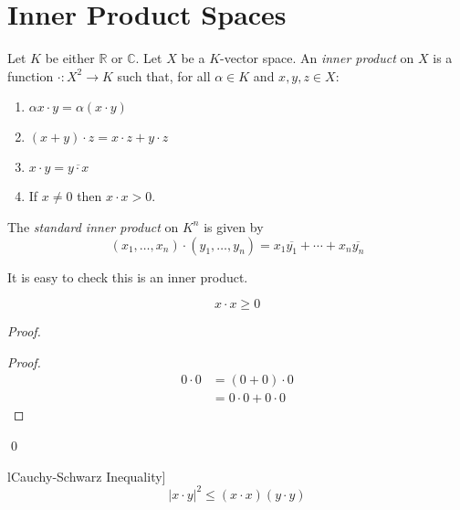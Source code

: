 \chapter{Inner Product Spaces}

\begin{df}
  Let $K$ be either $\mathbb{R}$ or $\mathbb{C}$. Let $X$ be a $K$-vector space. An \emph{inner product} on $X$ is a function $\cdot : X^2 \rightarrow K$ such that, for all $\alpha \in K$ and $x, y, z \in X$:
  \begin{enumerate}
    \item
    $\alpha x \cdot y = \alpha (x \cdot y)$
    \item
    $(x + y) \cdot z = x \cdot z + y \cdot z$
    \item
    $x \cdot y = \overline{y \cdot x}$
    \item
    If $x \neq 0$ then $x \cdot x > 0$.
  \end{enumerate}
\end{df}

\begin{ex}
  The \emph{standard inner product} on $K^n$ is given by
  \[ (x_1, \ldots, x_n) \cdot (y_1, \ldots, y_n) = x_1 \overline{y_1} + \cdots + x_n \overline{y_n} \]

  It is easy to check this is an inner product.
\end{ex}

\begin{prop}
  \label{prop:inner_product:positive_definite}
  \[ x \cdot x \geq 0 \]
\end{prop}

\begin{proof}
  \pf
  \begin{proof}
    \pf
    \begin{align*}
      0 \cdot 0 & = (0 + 0) \cdot 0 \\
      & = 0 \cdot 0 + 0 \cdot 0
    \end{align*}
  \end{proof}
  \qed
\end{proof}

\begin{prop}lCauchy-Schwarz Inequality]
  \[ | x \cdot y |^2 \leq (x \cdot x) (y \cdot y) \]
\end{prop}

